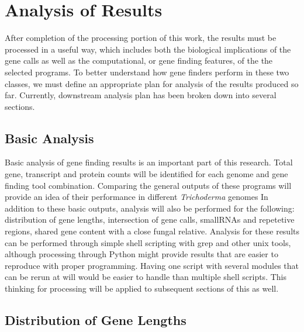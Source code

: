 \section{Analysis of Results}

After completion of the processing portion of this work, the results
must be processed in a useful way, which includes both the biological
implications of the gene calls as well as the computational, or gene
finding features, of the the selected programs. To better understand
how gene finders perform in these two classes, we must define an
appropriate plan for analysis of the results produced so
far. Currently, downstream analysis plan has been broken down into
several sections.

\subsection{Basic Analysis}

Basic analysis of gene finding results is an important part of this
research. Total gene, transcript and protein counts will be identified
for each genome and gene finding tool combination. Comparing the
general outputs of these programs will provide an idea of their
performance in different \textit{Trichoderma} genomes In addition to
these basic outputs, analysis will also be performed for the
following: distribution of gene lengths, intersection of gene calls,
smallRNAs and repetetive regions, shared gene content with a close
fungal relative. Analysis for these results can be performed through
simple shell scripting with grep and other unix tools, although
processing through Python might provide results that are easier to
reproduce with proper programming. Having one script with several
modules that can be rerun at will would be easier to handle than
multiple shell scripts. This thinking for processing will be applied
to subsequent sections of this as well.

\subsection{Distribution of Gene Lengths}

